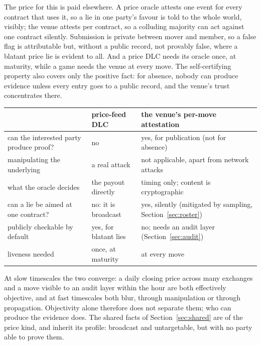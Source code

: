 \documentclass[11pt]{article}
\begin{document}
The price for this is paid elsewhere. A price oracle attests one event
for every contract that uses it, so a lie in one party's favour is told
to the whole world, visibly; the venue attests per contract, so a
colluding majority can act against one contract silently. Submission
is private between mover and member, so a false flag is attributable
but, without a public record, not provably false, where a blatant price
lie is evident to all. And a price DLC needs its
oracle once, at maturity, while a game needs the venue at every move.
The self-certifying property also covers only the positive fact: for
absence, nobody can produce evidence unless every entry goes to a
public record, and the venue's trust concentrates there.

\begin{center}
\small
\begin{tabular}{>{\raggedright\arraybackslash}p{50mm}>{\raggedright\arraybackslash}p{38mm}>{\raggedright\arraybackslash}p{46mm}}
\toprule
 & price-feed DLC & the venue's per-move attestation \\
\midrule
can the interested party produce proof? & no & yes, for publication (not for absence) \\
manipulating the underlying & a real attack & not applicable, apart from network attacks \\
what the oracle decides & the payout directly & timing only; content is cryptographic \\
can a lie be aimed at one contract? & no: it is broadcast & yes, silently (mitigated by sampling, Section~\ref{sec:roster}) \\
publicly checkable by default & yes, for blatant lies & no; needs an audit layer (Section~\ref{sec:audit}) \\
liveness needed & once, at maturity & at every move \\
\bottomrule
\end{tabular}
\end{center}

At slow timescales the two converge: a daily closing price across many
exchanges and a move visible to an audit layer within the hour are both
effectively objective, and at fast timescales both blur, through
manipulation or through propagation. Objectivity alone therefore does
not separate them; who can produce the evidence does. The shared facts
of Section~\ref{sec:shared} are of the price kind, and inherit its
profile: broadcast and untargetable, but with no party able to prove
them.
\end{document}

